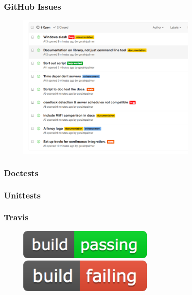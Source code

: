 \documentclass{beamer}
\begin{document}
\begin{frame}
\frametitle{GitHub Issues}
\begin{figure}
    \includegraphics[width=0.8\textwidth]{githubissues}
\end{figure}
\end{frame}

\begin{frame}
\begin{figure}
    
\end{figure}
\end{frame}

\begin{frame}
\frametitle{Doctests}
\resizebox{\textwidth}{!}{%
%
}
\end{frame}

\begin{frame}
\frametitle{Unittests}
\resizebox{\textwidth}{!}{%
%
}
\end{frame}

\begin{frame}
\frametitle{Travis}
\begin{figure}
    \vfill
    \includegraphics[width=0.6\textwidth]{travispass}
    \vfill
    \includegraphics[width=0.6\textwidth]{travisfail}
    \vfill
\end{figure}
\end{frame}
\end{document}
